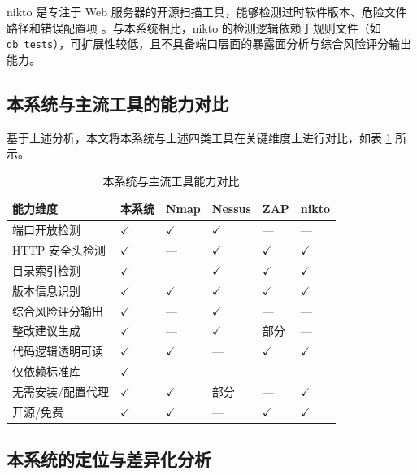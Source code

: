 \documentclass[12pt,a4paper,fontset=none]{ctexart}
\begin{document}
nikto 是专注于 Web 服务器的开源扫描工具，能够检测过时软件版本、危险文件路径和错误配置项 \cite{owasp-cheatsheet}。与本系统相比，nikto 的检测逻辑依赖于规则文件（如 \texttt{db\_tests}），可扩展性较低，且不具备端口层面的暴露面分析与综合风险评分输出能力。

\subsection{本系统与主流工具的能力对比}

基于上述分析，本文将本系统与上述四类工具在关键维度上进行对比，如表 \ref{tab:tool-compare} 所示。

\begin{table}[H]
  \centering
  \caption{本系统与主流工具能力对比}
  \label{tab:tool-compare}
  \begin{tabularx}{\textwidth}{X >{\centering\arraybackslash}p{1.5cm} >{\centering\arraybackslash}p{1.5cm} >{\centering\arraybackslash}p{1.5cm} >{\centering\arraybackslash}p{1.5cm} >{\centering\arraybackslash}p{1.5cm}}
    \toprule
    能力维度 & 本系统 & Nmap & Nessus & ZAP & nikto \\
    \midrule
    端口开放检测 & $\checkmark$ & $\checkmark$ & $\checkmark$ & — & — \\
    HTTP 安全头检测 & $\checkmark$ & — & $\checkmark$ & $\checkmark$ & $\checkmark$ \\
    目录索引检测 & $\checkmark$ & — & $\checkmark$ & $\checkmark$ & $\checkmark$ \\
    版本信息识别 & $\checkmark$ & $\checkmark$ & $\checkmark$ & $\checkmark$ & $\checkmark$ \\
    综合风险评分输出 & $\checkmark$ & — & $\checkmark$ & — & — \\
    整改建议生成 & $\checkmark$ & — & $\checkmark$ & 部分 & — \\
    代码逻辑透明可读 & $\checkmark$ & $\checkmark$ & — & $\checkmark$ & $\checkmark$ \\
    仅依赖标准库 & $\checkmark$ & — & — & — & — \\
    无需安装/配置代理 & $\checkmark$ & $\checkmark$ & 部分 & — & $\checkmark$ \\
    开源/免费 & $\checkmark$ & $\checkmark$ & — & $\checkmark$ & $\checkmark$ \\
    \bottomrule
  \end{tabularx}
\end{table}

\subsection{本系统的定位与差异化分析}
\end{document}
